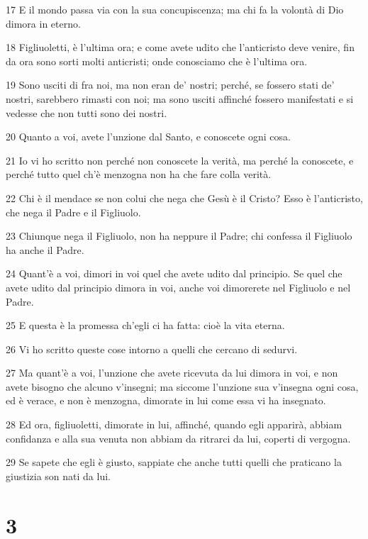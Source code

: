 \par 17 E il mondo passa via con la sua concupiscenza; ma chi fa la volontà di Dio dimora in eterno.
\par 18 Figliuoletti, è l'ultima ora; e come avete udito che l'anticristo deve venire, fin da ora sono sorti molti anticristi; onde conosciamo che è l'ultima ora.
\par 19 Sono usciti di fra noi, ma non eran de' nostri; perché, se fossero stati de' nostri, sarebbero rimasti con noi; ma sono usciti affinché fossero manifestati e si vedesse che non tutti sono dei nostri.
\par 20 Quanto a voi, avete l'unzione dal Santo, e conoscete ogni cosa.
\par 21 Io vi ho scritto non perché non conoscete la verità, ma perché la conoscete, e perché tutto quel ch'è menzogna non ha che fare colla verità.
\par 22 Chi è il mendace se non colui che nega che Gesù è il Cristo? Esso è l'anticristo, che nega il Padre e il Figliuolo.
\par 23 Chiunque nega il Figliuolo, non ha neppure il Padre; chi confessa il Figliuolo ha anche il Padre.
\par 24 Quant'è a voi, dimori in voi quel che avete udito dal principio. Se quel che avete udito dal principio dimora in voi, anche voi dimorerete nel Figliuolo e nel Padre.
\par 25 E questa è la promessa ch'egli ci ha fatta: cioè la vita eterna.
\par 26 Vi ho scritto queste cose intorno a quelli che cercano di sedurvi.
\par 27 Ma quant'è a voi, l'unzione che avete ricevuta da lui dimora in voi, e non avete bisogno che alcuno v'insegni; ma siccome l'unzione sua v'insegna ogni cosa, ed è verace, e non è menzogna, dimorate in lui come essa vi ha insegnato.
\par 28 Ed ora, figliuoletti, dimorate in lui, affinché, quando egli apparirà, abbiam confidanza e alla sua venuta non abbiam da ritrarci da lui, coperti di vergogna.
\par 29 Se sapete che egli è giusto, sappiate che anche tutti quelli che praticano la giustizia son nati da lui.

\chapter{3}


